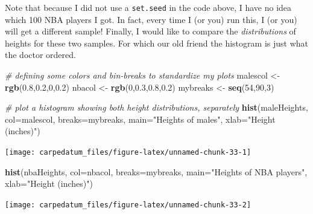 \documentclass[openany]{book}
\newenvironment{Shaded}{\begin{snugshade}}{\end{snugshade}}
\newcommand{\CommentTok}[1]{\textcolor[rgb]{0.56,0.35,0.01}{\textit{#1}}}
\newcommand{\DataTypeTok}[1]{\textcolor[rgb]{0.13,0.29,0.53}{#1}}
\newcommand{\DecValTok}[1]{\textcolor[rgb]{0.00,0.00,0.81}{#1}}
\newcommand{\FloatTok}[1]{\textcolor[rgb]{0.00,0.00,0.81}{#1}}
\newcommand{\KeywordTok}[1]{\textcolor[rgb]{0.13,0.29,0.53}{\textbf{#1}}}
\newcommand{\NormalTok}[1]{#1}
\newcommand{\StringTok}[1]{\textcolor[rgb]{0.31,0.60,0.02}{#1}}
\begin{document}
Note that because I did not use a \texttt{set.seed} in the code above, I have no idea which 100 NBA players I got. In fact, every time I (or you) run this, I (or you) will get a different sample! Finally, I would like to compare the \emph{distributions} of heights for these two samples. For which our old friend the histogram is just what the doctor ordered.

\begin{Shaded}
\begin{Highlighting}[]
\CommentTok{# defining some colors and bin-breaks to standardize my plots}
\NormalTok{malescol <-}\StringTok{ }\KeywordTok{rgb}\NormalTok{(}\FloatTok{0.8}\NormalTok{,}\FloatTok{0.2}\NormalTok{,}\DecValTok{0}\NormalTok{,}\FloatTok{0.2}\NormalTok{)}
\NormalTok{nbacol <-}\StringTok{ }\KeywordTok{rgb}\NormalTok{(}\DecValTok{0}\NormalTok{,}\FloatTok{0.3}\NormalTok{,}\FloatTok{0.8}\NormalTok{,}\FloatTok{0.2}\NormalTok{)}
\NormalTok{mybreaks <-}\StringTok{ }\KeywordTok{seq}\NormalTok{(}\DecValTok{54}\NormalTok{,}\DecValTok{90}\NormalTok{,}\DecValTok{3}\NormalTok{)}

\CommentTok{# plot a histogram showing both height distributions, separately}
\KeywordTok{hist}\NormalTok{(maleHeights, }\DataTypeTok{col=}\NormalTok{malescol, }\DataTypeTok{breaks=}\NormalTok{mybreaks, }
          \DataTypeTok{main=}\StringTok{"Heights of males"}\NormalTok{, }\DataTypeTok{xlab=}\StringTok{"Height (inches)"}\NormalTok{)}
\end{Highlighting}
\end{Shaded}

\begin{center}\texttt{[image: carpedatum\_files/figure-latex/unnamed-chunk-33-1]} \end{center}

\begin{Shaded}
\begin{Highlighting}[]
\KeywordTok{hist}\NormalTok{(nbaHeights, }\DataTypeTok{col=}\NormalTok{nbacol, }\DataTypeTok{breaks=}\NormalTok{mybreaks, }
     \DataTypeTok{main=}\StringTok{"Heights of NBA players"}\NormalTok{, }\DataTypeTok{xlab=}\StringTok{"Height (inches)"}\NormalTok{)}
\end{Highlighting}
\end{Shaded}

\begin{center}\texttt{[image: carpedatum\_files/figure-latex/unnamed-chunk-33-2]} \end{center}
\end{document}
